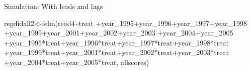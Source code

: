 \documentclass[
  ignorenonframetext,
]{beamer}
\newenvironment{Shaded}{\begin{snugshade}}{\end{snugshade}}
\newcommand{\FunctionTok}[1]{\textcolor[rgb]{0.00,0.00,0.00}{#1}}
\newcommand{\NormalTok}[1]{#1}
\newcommand{\OtherTok}[1]{\textcolor[rgb]{0.56,0.35,0.01}{#1}}
\newcommand{\SpecialCharTok}[1]{\textcolor[rgb]{0.00,0.00,0.00}{#1}}
\begin{document}
\begin{frame}[fragile]{Simulation: With leads and lags}
\begin{Shaded}
\begin{Highlighting}[]
\NormalTok{regdidall2}\OtherTok{\textless{}{-}}\FunctionTok{felm}\NormalTok{(read4}\SpecialCharTok{\textasciitilde{}}\NormalTok{treat}
                 \SpecialCharTok{+}\NormalTok{year\_1995}\SpecialCharTok{+}\NormalTok{year\_1996}\SpecialCharTok{+}\NormalTok{year\_1997}\SpecialCharTok{+}\NormalTok{year\_1998}
                 \SpecialCharTok{+}\NormalTok{year\_1999}\SpecialCharTok{+}\NormalTok{year\_2001}\SpecialCharTok{+}\NormalTok{year\_2002}\SpecialCharTok{+}\NormalTok{year\_2003}
                 \SpecialCharTok{+}\NormalTok{year\_2004}\SpecialCharTok{+}\NormalTok{year\_2005}
                 \SpecialCharTok{+}\NormalTok{year\_1995}\SpecialCharTok{*}\NormalTok{treat}\SpecialCharTok{+}\NormalTok{year\_1996}\SpecialCharTok{*}\NormalTok{treat}\SpecialCharTok{+}\NormalTok{year\_1997}\SpecialCharTok{*}\NormalTok{treat}\SpecialCharTok{+}\NormalTok{year\_1998}\SpecialCharTok{*}\NormalTok{treat}
                 \SpecialCharTok{+}\NormalTok{year\_1999}\SpecialCharTok{*}\NormalTok{treat}\SpecialCharTok{+}\NormalTok{year\_2001}\SpecialCharTok{*}\NormalTok{treat}\SpecialCharTok{+}\NormalTok{year\_2002}\SpecialCharTok{*}\NormalTok{treat}\SpecialCharTok{+}\NormalTok{year\_2003}\SpecialCharTok{*}\NormalTok{treat}
                 \SpecialCharTok{+}\NormalTok{year\_2004}\SpecialCharTok{*}\NormalTok{treat}\SpecialCharTok{+}\NormalTok{year\_2005}\SpecialCharTok{*}\NormalTok{treat,}
\NormalTok{                 allscores)}
\end{Highlighting}
\end{Shaded}
\end{frame}
\end{document}
